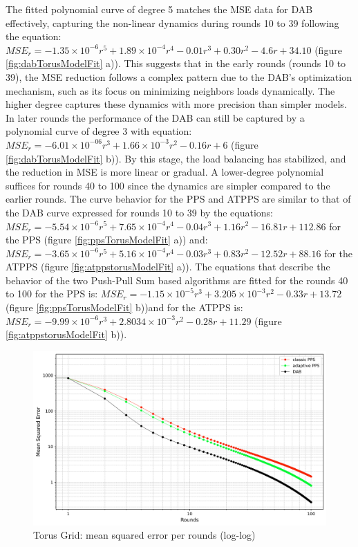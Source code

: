 The fitted polynomial curve of degree 5 matches the MSE data for DAB effectively, capturing the non-linear dynamics during rounds 10 to 39 following the equation: $MSE_r=-1.35\times 10^{-6}r^{5}+ 1.89\times 10^{-4}r^{4}-0.01r^{3}+0.30r^{2}-4.6r+34.10$ (figure \ref{fig:dabTorusModelFit} a)). This suggests that in the early rounds (rounds 10 to 39), the MSE reduction follows a complex pattern due to the DAB's optimization mechanism, such as its focus on minimizing neighbors loads dynamically. The higher degree captures these dynamics with more precision than simpler models. In later rounds the performance of the DAB can still be captured by a polynomial curve of degree 3 with equation: $MSE_r=-6.01\times 10^{-06}r^{3}+1.66\times 10^{-3}r^{2}-0.16r+6$ (figure \ref{fig:dabTorusModelFit} b)). By this stage, the load balancing has stabilized, and the reduction in MSE is more linear or gradual. A lower-degree polynomial suffices for rounds 40 to 100 since the dynamics are simpler compared to the earlier rounds. The curve behavior for the PPS and ATPPS are similar to that of the DAB curve expressed for rounds 10 to 39 by the equations: $MSE_r=-5.54\times 10^{-6}r^{5}+7.65\times 10^{-4}r^{4}-0.04r^{3}+1.16r^{2}-16.81r+112.86$ for the PPS (figure \ref{fig:ppsTorusModelFit} a)) and: $MSE_r = -3.65 \times 10^{-6}r^{5} + 5.16 \times 10^{-4}r^{4} - 0.03r^{3} + 0.83r^{2} - 12.52r + 88.16$ for the ATPPS (figure \ref{fig:atppstorusModelFit} a)). The equations that describe the behavior of the two Push-Pull Sum based algorithms are fitted for the rounds 40 to 100 for the PPS is: $MSE_r = -1.15 \times 10^{-5}r^{3} + 3.205\times 10^{-3}r^{2} - 0.33r + 13.72$ (figure \ref{fig:ppsTorusModelFit} b))and for the ATPPS is: $MSE_r = -9.99 \times 10^{-6}r^{3} + 2.8034\times 10^{-3}r^{2} - 0.28r + 11.29$ (figure \ref{fig:atppstorusModelFit} b)). 
\begin{figure}[]
    \centering
    \includegraphics[width=\linewidth]{figures/Simulation_outcomes/TorusGridGraph/DAB_vs_PPS_TGG_r100_n1024_averaged_loglog.png}
    \caption{Torus Grid: mean squared error per rounds (log-log)}
    \label{fig:torusMSEperRoundLogLog}
\end{figure}
